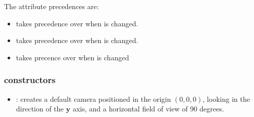 The attribute precedences are:

\begin{itemize}
  \item {} takes precedence over  when  is changed.
	\item {} takes precedence over  when  is changed.
	\item {} takes precence over  when  is changed
\end{itemize}

\subsubsection*{constructors}
\begin{itemize}
	\item {}: 
		creates a default camera positioned in the origin $\left(0,0,0\right)$, looking in the direction of the $\mathbf{y}$ axis, and a horizontal field of view of 90 degrees.
\end{itemize}

